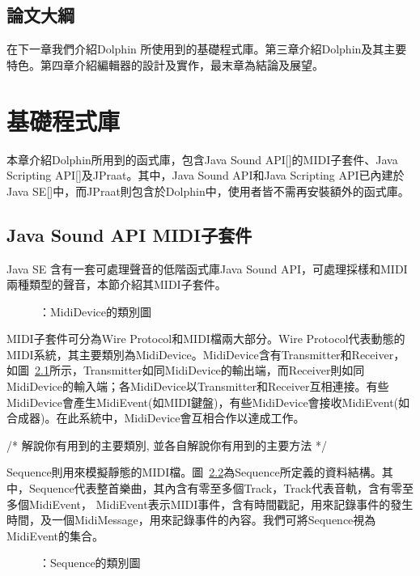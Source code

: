 \documentclass[12pt,a4paper,oneside]{report}
\begin{document}
\section{論文大綱}

在下一章我們介紹Dolphin 所使用到的基礎程式庫。第三章介紹Dolphin及其主要特色。第四章介紹編輯器的設計及實作，最末章為結論及展望。

\chapter{基礎程式庫}

本章介紹Dolphin所用到的函式庫，包含Java Sound API[]的MIDI子套件、Java Scripting API[]及JPraat。其中，Java Sound API和Java Scripting API已內建於Java SE[]中，而JPraat則包含於Dolphin中，使用者皆不需再安裝額外的函式庫。

\section{Java Sound API MIDI子套件}

Java SE 含有一套可處理聲音的低階函式庫Java Sound API，可處理採樣和MIDI兩種類型的聲音，本節介紹其MIDI子套件。

\begin{figure}
\caption{ \label{fig:mididevice}：MidiDevice的類別圖 }
\end{figure}

MIDI子套件可分為Wire Protocol和MIDI檔兩大部分。Wire Protocol代表動態的MIDI系統，其主要類別為MidiDevice。MidiDevice含有Transmitter和Receiver，如圖~\ref{fig:mididevice}所示，Transmitter如同MidiDevice的輸出端，而Receiver則如同MidiDevice的輸入端；各MidiDevice以Transmitter和Receiver互相連接。有些MidiDevice會產生MidiEvent(如MIDI鍵盤)，有些MidiDevice會接收MidiEvent(如合成器)。在此系統中，MidiDevice會互相合作以達成工作。

/*
     解說你有用到的主要類別, 並各自解說你有用到的主要方法
*/




Sequence則用來模擬靜態的MIDI檔。圖~\ref{fig:sequence}為Sequence所定義的資料結構。其中，Sequence代表整首樂曲，其內含有零至多個Track，Track代表音軌，含有零至多個MidiEvent， MidiEvent表示MIDI事件，含有時間戳記，用來記錄事件的發生時間，及一個MidiMessage，用來記錄事件的內容。我們可將Sequence視為MidiEvent的集合。

\begin{figure}
\caption{ \label{fig:sequence}：Sequence的類別圖 }
\end{figure}
\end{document}
